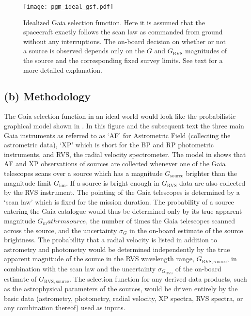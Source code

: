 \begin{figure}[t]
    \centering
    \texttt{[image: pgm\_ideal\_gsf.pdf]}
    \caption{Idealized Gaia selection function. Here it is assumed that the spacecraft exactly follows the scan law as commanded from ground without any interruptions. The on-board decision on whether or not a source is observed depends only on the $G$ and $G_\mathrm{RVS}$ magnitudes of the source and the corresponding fixed survey limits. See text for a more detailed explanation.}
    \label{fig:gsf_ideal}
\end{figure}

\subsection{(b) Methodology}
\label{sec:methods}

The Gaia selection function in an ideal world would look like the probabilistic graphical model shown in . In this figure and the subsequent text the three main Gaia instruments as referred to as `AF' for Astrometric Field (collecting the astrometric data), `XP' which is short for the BP and RP photometric instruments, and RVS, the radial velocity spectrometer. The model in  shows that AF and XP observations of sources are collected whenever one of the Gaia telescopes scans over a source which has a magnitude $G_\mathrm{source}$ brighter than the magnitude limit $G_\mathrm{lim}$. If a source is bright enough in $G_\mathrm{RVS}$ data are also collected by the RVS instrument. The pointing of the Gaia telescopes is determined by a `scan law' which is fixed for the mission duration. The probability of a source entering the Gaia catalogue would thus be determined only by its true apparent magnitude $G_mathrm{source}$, the number of times the Gaia telescopes scanned across the source, and the uncertainty $\sigma_G$ in the on-board estimate of the source brightness. The probability that a radial velocity is listed in addition to astrometry and photometry would be determined independently by the true apparent magnitude of the source in the RVS wavelength range, $G_\mathrm{RVS,source}$, in combination with the scan law and the uncertainty $\sigma_{G_\mathrm{RVS}}$ of the on-board estimate of $G_\mathrm{RVS,source}$. The selection function for any derived data products, such as the astrophysical parameters of the sources, would be driven entirely by the basic data (astrometry, photometry, radial velocity, XP spectra, RVS spectra, or any combination thereof) used as inputs.

